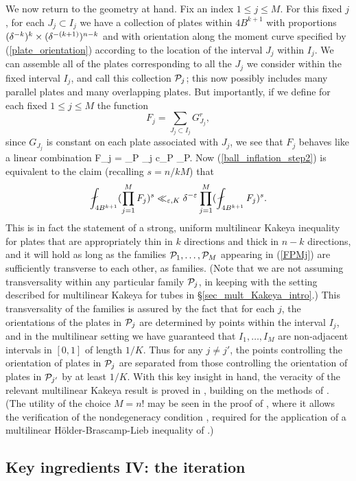 \documentclass[brochure,english,12pt]{bourbaki}%
\begin{document}
We now return to the geometry at hand. Fix an index $1 \leq j \leq M$. For this fixed $j$, for each $J_j \subset I_j$ we have a collection of  plates  within $4B^{k+1}$ with proportions $(\delta^{-k})^k \times (\delta^{-(k+1)})^{n-k}$ and with orientation along the moment curve specified by (\ref{plate_orientation}) according to the location of the interval $J_j$ within $I_j$. We can assemble all of the plates corresponding to all the $J_j$ we consider within the fixed interval $I_j$, and call this collection $\mathcal{P}_j$; this now possibly includes many parallel plates and many overlapping plates. But importantly, if we define for each fixed $1 \leq j \leq M$ the function 
\[ F_j = \sum_{J_j \subset I_j} G_{J_j}^r, \]
since $G_{J_j}$ is constant on each plate associated with $J_j$, we see that $F_j$ behaves like a linear combination 
\beq\label{FPMj}
 F_j =  \sum_{P \in \Pcal_j} c_P \onebf_P.
 \eeq
Now (\ref{ball_inflation_step2}) is equivalent to the claim (recalling $s=n/kM$) that 
\[  \fint_{4B^{k+1}} (\prod_{j=1}^M F_j )^s
 	\ll_{\ep,K}\del^{-\ep} \prod_{j=1}^M (  \fint_{4B^{k+1}}F_j)^s.\]
This is in fact the statement of a strong, uniform multilinear Kakeya inequality for plates that are appropriately thin in $k$ directions and thick in $n-k$ directions, and it will hold as long as the families $\mathcal{P}_1,\ldots, \mathcal{P}_M$ appearing in (\ref{FPMj}) are sufficiently transverse to each other, as families. (Note that we are not assuming transversality within any particular family $\mathcal{P}_j$, in keeping with the setting described for multilinear Kakeya for tubes in \S \ref{sec_mult_Kakeya_intro}.)
This transversality of the families  is assured by the fact that for each $j$, the orientations of the plates in $\mathcal{P}_j$ are determined by points within the interval $I_j$, and in the multilinear setting we have guaranteed that $I_1,\ldots, I_M$ are non-adjacent intervals in $[0,1]$ of length $1/K$. Thus for any $j \neq j'$, the points controlling the orientation of plates in $\mathcal{P}_j$ are separated from those controlling the orientation of plates in $\mathcal{P}_{j'}$ by at least $1/K$.
With this key insight in hand, the veracity of the relevant multilinear Kakeya result  is proved in \cite[\S 6]{BDG16}, building on the methods of \cite{Gut15}. (The utility of the choice $M=n!$ may be seen in the proof of \cite[Lemma 6.3]{BDG16}, where it allows the verification of the nondegeneracy condition \cite[Eqn. (8)]{BDG16}, required for the application of a multilinear H\"{o}lder-Brascamp-Lieb inequality of \cite{BCCT10}.)


\subsection{Key ingredients IV: the iteration}
\end{document}
